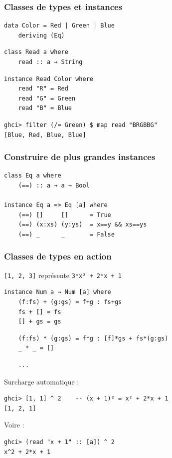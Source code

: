 \documentclass[10pt]{beamer}
\begin{document}
\begin{frame}[fragile]
\frametitle{Classes de types et instances}
\begin{verbatim}
data Color = Red | Green | Blue
    deriving (Eq)
\end{verbatim}

\begin{verbatim}
class Read a where
    read :: a → String
\end{verbatim}
\pause
\begin{verbatim}
instance Read Color where
    read "R" = Red
    read "G" = Green
    read "B" = Blue
\end{verbatim}
\pause
\begin{verbatim}
ghci> filter (/= Green) $ map read "BRGBBG"
[Blue, Red, Blue, Blue]
\end{verbatim}
\end{frame}



\begin{frame}[fragile]
\frametitle{Construire de plus grandes instances}
\begin{verbatim}
class Eq a where
    (==) :: a → a → Bool

instance Eq a => Eq [a] where
    (==) []     []      = True
    (==) (x:xs) (y:ys)  = x==y && xs==ys
    (==) _      _       = False
\end{verbatim}
\end{frame}




\begin{frame}[fragile]
\frametitle{Classes de types en action}

\verb|[1, 2, 3]| représente \verb|3*x² + 2*x + 1|

\begin{verbatim}
instance Num a ⇒ Num [a] where
    (f:fs) + (g:gs) = f+g : fs+gs
    fs + [] = fs
    [] + gs = gs
\end{verbatim}
\pause
\begin{verbatim}
    (f:fs) * (g:gs) = f*g : [f]*gs + fs*(g:gs)
    _ * _ = []
\end{verbatim}
\pause
\begin{verbatim}
    ...
\end{verbatim}

Surcharge automatique :

\begin{verbatim}
ghci> [1, 1] ^ 2    -- (x + 1)² = x² + 2*x + 1
[1, 2, 1]
\end{verbatim}

\pause

Voire :

\begin{verbatim}
ghci> (read "x + 1" :: [a]) ^ 2
x^2 + 2*x + 1
\end{verbatim}

\end{frame}
\end{document}
